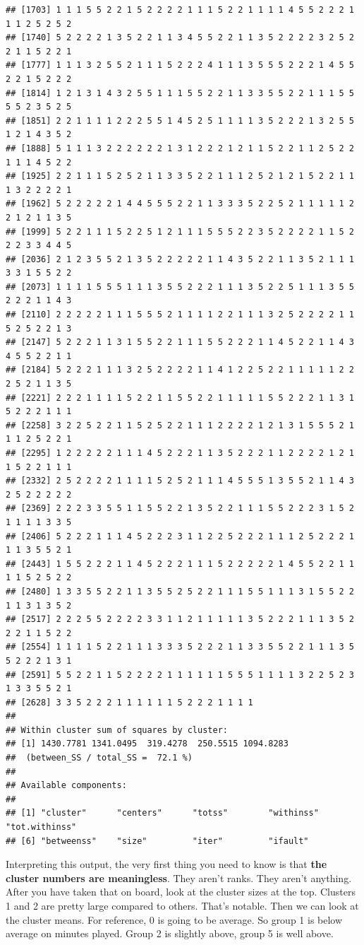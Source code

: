 \documentclass[]{book}
\begin{document}
\begin{verbatim}
## [1703] 1 1 1 5 5 2 2 1 5 2 2 2 2 1 1 1 5 2 2 1 1 1 1 4 5 5 2 2 2 1 1 1 2 5 2 5 2
## [1740] 5 2 2 2 2 1 3 5 2 2 1 1 3 4 5 5 2 2 1 1 3 5 2 2 2 2 3 2 5 2 2 1 1 5 2 2 1
## [1777] 1 1 1 3 2 5 5 2 1 1 1 5 2 2 2 4 1 1 1 3 5 5 5 2 2 2 1 4 5 5 2 2 1 5 2 2 2
## [1814] 1 2 1 3 1 4 3 2 5 5 1 1 1 5 5 2 2 1 1 3 3 5 5 2 2 1 1 1 5 5 5 5 2 3 5 2 5
## [1851] 2 2 1 1 1 1 2 2 2 5 5 1 4 5 2 5 1 1 1 1 3 5 2 2 2 1 3 2 5 5 1 2 1 4 3 5 2
## [1888] 5 1 1 1 3 2 2 2 2 2 2 1 3 1 2 2 2 1 2 1 1 5 2 2 1 1 2 5 2 2 1 1 1 4 5 2 2
## [1925] 2 2 1 1 1 5 2 5 2 1 1 3 3 5 2 2 1 1 1 2 5 2 1 2 1 5 2 2 1 1 1 3 2 2 2 2 1
## [1962] 5 2 2 2 2 2 1 4 4 5 5 5 2 2 1 1 3 3 3 5 2 2 5 2 1 1 1 1 1 2 2 1 2 1 1 3 5
## [1999] 5 2 2 1 1 1 5 2 2 5 1 2 1 1 1 5 5 5 2 2 3 5 2 2 2 2 1 1 5 2 2 2 3 3 4 4 5
## [2036] 2 1 2 3 5 5 2 1 3 5 2 2 2 2 2 1 1 4 3 5 2 2 1 1 3 5 2 1 1 1 3 3 1 5 5 2 2
## [2073] 1 1 1 1 5 5 5 1 1 1 3 5 5 2 2 2 1 1 1 3 5 2 2 5 1 1 1 3 5 5 2 2 2 1 1 4 3
## [2110] 2 2 2 2 2 1 1 1 5 5 5 2 1 1 1 1 2 2 1 1 1 3 2 5 2 2 2 2 1 1 5 2 5 2 2 1 3
## [2147] 5 2 2 2 1 1 3 1 5 5 2 2 1 1 1 5 5 2 2 2 1 1 4 5 2 2 1 1 4 3 4 5 5 2 2 1 1
## [2184] 5 2 2 2 1 1 1 3 2 5 2 2 2 2 1 1 4 1 2 2 5 2 2 1 1 1 1 1 2 2 2 5 2 1 1 3 5
## [2221] 2 2 2 1 1 1 1 5 2 2 1 1 5 5 2 2 1 1 1 1 1 5 5 2 2 2 1 1 3 1 5 2 2 2 1 1 1
## [2258] 3 2 2 5 2 2 1 1 5 2 5 2 2 1 1 1 2 2 2 2 1 2 1 3 1 5 5 5 2 1 1 1 2 5 2 2 1
## [2295] 1 2 2 2 2 2 1 1 1 4 5 2 2 2 1 1 3 5 2 2 2 1 1 2 2 2 2 1 2 1 1 5 2 2 1 1 1
## [2332] 2 5 2 2 2 2 1 1 1 1 5 2 5 2 1 1 1 4 5 5 5 1 3 5 5 2 1 1 4 3 2 5 2 2 2 2 2
## [2369] 2 2 2 3 3 5 5 1 1 5 5 2 2 1 3 5 2 2 1 1 1 5 5 2 2 2 3 1 5 2 1 1 1 1 3 3 5
## [2406] 5 2 2 2 1 1 1 4 5 2 2 2 3 1 1 2 2 5 2 2 2 1 1 1 2 5 2 2 2 1 1 1 3 5 5 2 1
## [2443] 1 5 5 2 2 2 1 1 4 5 2 2 2 1 1 1 5 2 2 2 2 2 1 4 5 5 2 2 1 1 1 1 5 2 5 2 2
## [2480] 1 3 3 5 5 2 2 1 1 3 5 5 2 5 2 2 1 1 1 5 5 1 1 1 3 1 5 5 2 2 1 1 3 1 3 5 2
## [2517] 2 2 2 5 5 2 2 2 2 3 3 1 1 2 1 1 1 1 1 3 5 2 2 2 1 1 1 3 5 2 2 2 1 1 5 2 2
## [2554] 1 1 1 1 5 2 2 1 1 1 3 3 3 5 2 2 2 1 1 3 3 5 5 2 2 1 1 1 3 5 5 2 2 2 1 3 1
## [2591] 5 5 2 2 1 1 5 2 2 2 2 1 1 1 1 1 1 5 5 5 1 1 1 1 3 2 2 5 2 3 1 3 3 5 5 2 1
## [2628] 3 3 5 2 2 2 1 1 1 1 1 1 5 2 2 2 1 1 1 1
## 
## Within cluster sum of squares by cluster:
## [1] 1430.7781 1341.0495  319.4278  250.5515 1094.8283
##  (between_SS / total_SS =  72.1 %)
## 
## Available components:
## 
## [1] "cluster"      "centers"      "totss"        "withinss"     "tot.withinss"
## [6] "betweenss"    "size"         "iter"         "ifault"
\end{verbatim}

Interpreting this output, the very first thing you need to know is that \textbf{the cluster numbers are meaningless}. They aren't ranks. They aren't anything. After you have taken that on board, look at the cluster sizes at the top. Clusters 1 and 2 are pretty large compared to others. That's notable. Then we can look at the cluster means. For reference, 0 is going to be average. So group 1 is below average on minutes played. Group 2 is slightly above, group 5 is well above.
\end{document}
